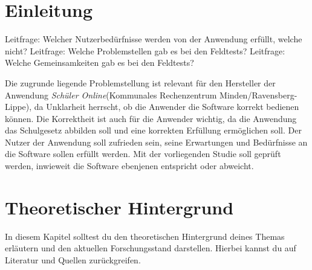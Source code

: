 \section{Einleitung}
Leitfrage: Welcher Nutzerbedürfnisse werden von der Anwendung erfüllt, welche nicht?
Leitfrage: Welche Problemstellen gab es bei den Feldtests?
Leitfrage: Welche Gemeinsamkeiten gab es bei den Feldtests?

Die zugrunde liegende Problemstellung ist relevant für den Hersteller der Anwendung \textit{Schüler Online}(\glqq Kommunales Rechenzentrum Minden/Ravensberg-Lippe\grqq{}), da Unklarheit herrscht, ob die Anwender die Software korrekt bedienen können. Die Korrektheit ist auch für die Anwender wichtig, da die Anwendung das Schulgesetz abbilden soll und eine korrekten Erfüllung ermöglichen soll. Der Nutzer der Anwendung soll zufrieden sein, seine Erwartungen und Bedürfnisse an die Software sollen erfüllt werden. Mit der vorliegenden Studie soll geprüft werden, inwieweit die Software ebenjenen entspricht oder abweicht.

\section{Theoretischer Hintergrund}
In diesem Kapitel solltest du den theoretischen Hintergrund deines Themas erläutern und den aktuellen Forschungsstand darstellen. Hierbei kannst du auf Literatur und Quellen zurückgreifen.

